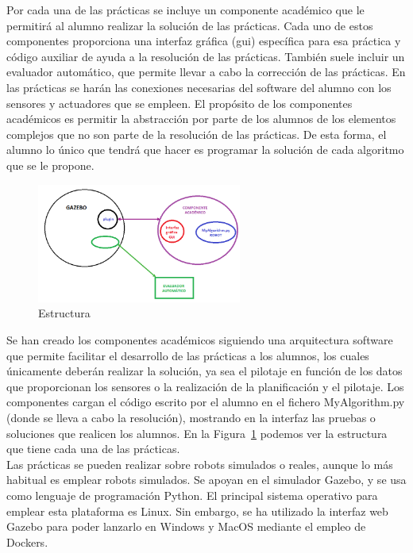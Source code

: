 Por cada una de las prácticas se incluye un componente académico que le permitirá al alumno realizar la solución de las prácticas. Cada uno de estos componentes proporciona una interfaz gráfica (\acrshort{gui}) específica para esa práctica y código auxiliar de ayuda a la resolución de las prácticas. También suele incluir un evaluador automático, que permite llevar a cabo la corrección de las prácticas. En las prácticas se harán las conexiones necesarias del software del alumno con los sensores y actuadores que se empleen. El propósito de los componentes académicos es permitir la abstracción por parte de los alumnos de los elementos complejos que no son parte de la resolución de las prácticas. De esta forma, el alumno lo único que tendrá que hacer es programar la solución de cada algoritmo que se le propone.
\begin{figure}[H]
  \begin{center}
    \includegraphics[width=0.6\textwidth]{figures/Introduccion/estructura.png}
		\caption{Estructura}
		\label{fig.estructura}
		\end{center}
\end{figure}

Se han creado los componentes académicos siguiendo una arquitectura software que permite facilitar el desarrollo de las prácticas a los alumnos, los cuales únicamente deberán realizar la solución, ya sea el pilotaje en función de los datos que proporcionan los sensores  o la realización de la planificación y el pilotaje. Los componentes cargan el código escrito por el alumno en el fichero MyAlgorithm.py (donde se lleva a cabo la resolución), mostrando en la interfaz las pruebas o soluciones que realicen los alumnos. En la Figura~\ref{fig.estructura} podemos ver la estructura que tiene cada una de las prácticas.\\

Las prácticas se pueden realizar sobre robots simulados o reales, aunque lo más habitual es emplear robots simulados. Se apoyan en el simulador Gazebo, y se usa como lenguaje de programación Python. El principal sistema operativo para emplear esta plataforma es Linux. Sin embargo, se ha utilizado la interfaz web Gazebo para poder lanzarlo en Windows y MacOS mediante el empleo de Dockers.\\

